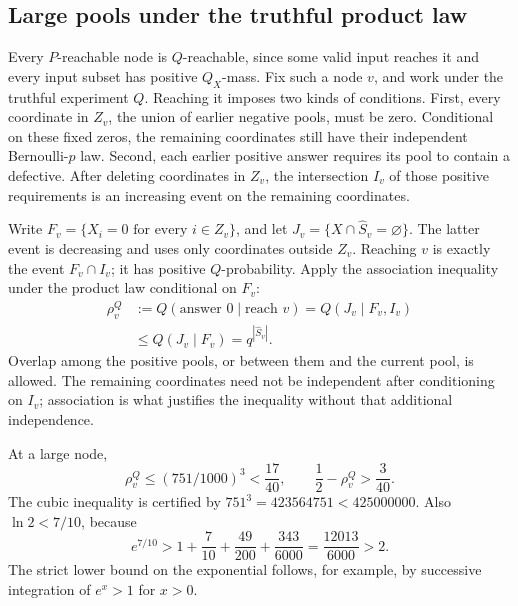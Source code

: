 \documentclass[11pt]{article}
\theoremstyle{definition}
\theoremstyle{remark}
\numberwithin{equation}{section}
\begin{document}
\subsection{Large pools under the truthful product law}

Every \(P\)-reachable node is \(Q\)-reachable, since some valid
input reaches it and every input subset has positive \(Q_X\)-mass.
Fix such a node \(v\), and work under the truthful experiment \(Q\).
Reaching it imposes two kinds of conditions. First, every coordinate
in \(Z_v\), the union of earlier negative pools, must be zero.
Conditional on these fixed zeros, the remaining coordinates still
have their independent Bernoulli-\(p\) law. Second, each earlier
positive answer requires its pool to contain a defective. After
deleting coordinates in \(Z_v\), the intersection \(I_v\) of those
positive requirements is an increasing event on the remaining
coordinates.

Write \(F_v=\{X_i=0\text{ for every }i\in Z_v\}\), and let
\(J_v=\{X\cap\widehat S_v=\varnothing\}\).
The latter event is decreasing and uses only coordinates outside
\(Z_v\). Reaching \(v\) is exactly the event \(F_v\cap I_v\);
it has positive \(Q\)-probability. Apply the association inequality
under the product law conditional on \(F_v\):
\begin{equation}\label{eq:largeprob}
 \begin{aligned}
 \rho_v^Q
 &:=Q(\text{answer }0\mid\text{reach }v)
   =Q(J_v\mid F_v,I_v)\\
 &\le Q(J_v\mid F_v)=q^{|\widehat S_v|}.
 \end{aligned}
\end{equation}
Overlap among the positive pools, or between them and the current
pool, is allowed. The remaining coordinates need not be independent
after conditioning on \(I_v\); association is what justifies the
inequality without that additional independence.

At a large node,
\[
 \rho_v^Q\le(751/1000)^3<\frac{17}{40},\qquad
 \frac12-\rho_v^Q>\frac3{40}.
\]
The cubic inequality is certified by
\(751^3=423564751<425000000\).
Also \(\ln2<7/10\), because
\[
 e^{7/10}>1+\frac7{10}+\frac{49}{200}+\frac{343}{6000}
 =\frac{12013}{6000}>2.
\]
The strict lower bound on the exponential follows, for example,
by successive integration of \(e^x>1\) for \(x>0\).
\end{document}
